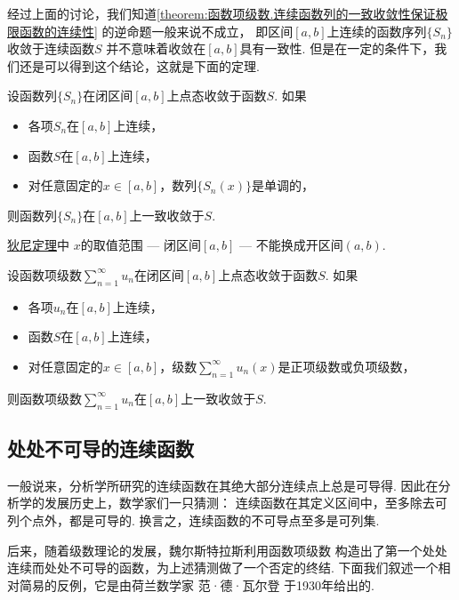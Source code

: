 经过上面的讨论，我们知道\cref{theorem:函数项级数.连续函数列的一致收敛性保证极限函数的连续性}
的逆命题一般来说不成立，
即区间\([a,b]\)上连续的函数序列\(\{S_n\}\)收敛于连续函数\(S\)
并不意味着收敛在\([a,b]\)具有一致性.
但是在一定的条件下，我们还是可以得到这个结论，这就是下面的定理.
\begin{theorem}[狄尼定理]\label{theorem:函数项级数.狄尼定理}
设函数列\(\{S_n\}\)在闭区间\([a,b]\)上点态收敛于函数\(S\).
如果\begin{itemize}
	\item 各项\(S_n\)在\([a,b]\)上连续，
	\item 函数\(S\)在\([a,b]\)上连续，
	\item 对任意固定的\(x\in[a,b]\)，数列\(\{S_n(x)\}\)是单调的，
\end{itemize}
则函数列\(\{S_n\}\)在\([a,b]\)上一致收敛于\(S\).
\end{theorem}
\begin{remark}
\hyperref[theorem:函数项级数.狄尼定理]{狄尼定理}中
\(x\)的取值范围 --- 闭区间\([a,b]\) --- 不能换成开区间\((a,b)\).
\end{remark}
\begin{theorem}
设函数项级数\(\sum_{n=1}^\infty u_n\)在闭区间\([a,b]\)上点态收敛于函数\(S\).
如果\begin{itemize}
	\item 各项\(u_n\)在\([a,b]\)上连续，
	\item 函数\(S\)在\([a,b]\)上连续，
	\item 对任意固定的\(x\in[a,b]\)，级数\(\sum_{n=1}^\infty u_n(x)\)是正项级数或负项级数，
\end{itemize}
则函数项级数\(\sum_{n=1}^\infty u_n\)在\([a,b]\)上一致收敛于\(S\).
\end{theorem}

\subsection{处处不可导的连续函数}
一般说来，分析学所研究的连续函数在其绝大部分连续点上总是可导得.
因此在分析学的发展历史上，数学家们一只猜测：
连续函数在其定义区间中，至多除去可列个点外，都是可导的.
换言之，连续函数的不可导点至多是可列集.

后来，随着级数理论的发展，魏尔斯特拉斯利用函数项级数
构造出了第一个处处连续而处处不可导的函数，为上述猜测做了一个否定的终结.
下面我们叙述一个相对简易的反例，它是由荷兰数学家 范·德·瓦尔登 于1930年给出的.

